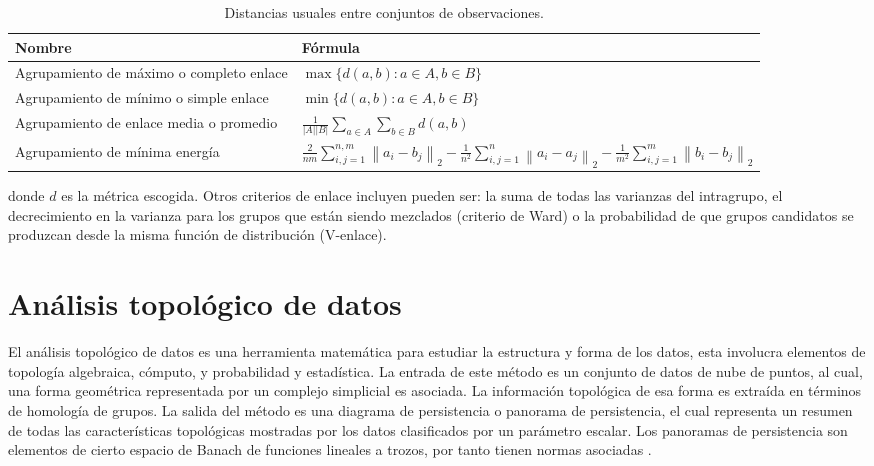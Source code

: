 \begin{table}[h]
	\centering
	\begin{tabular}{m{8cm} m{8cm}  }
		\toprule
		\textbf{Nombre} & \textbf{Fórmula}\\
		\midrule
		Agrupamiento de máximo o completo enlace & $\max \{d(a, b): a \in A, b \in B\}$ \\
		\hline
		Agrupamiento de mínimo o simple enlace & $\min \{d(a, b): a \in A, b \in B\}$ \\
		\hline
		Agrupamiento de enlace media o promedio & $\frac{1}{|A||B|} \sum_{a \in A} \sum_{b \in B} d(a, b)$ \\
		\hline
		Agrupamiento de mínima energía & \parbox[t]{8cm}{
			$\frac{2}{n m} \sum_{i,j=1}^{n,m}\left\|a_{i}-b_{j}\right\|_{2} -
			\frac{1}{n^{2}} \sum_{i,j=1}^{n}\left\|a_{i}-a_{j}\right\|_{2}-
			\frac{1}{m^{2}} \sum_{i, j=1}^{m}\left\|b_{i}-b_{j}\right\|_{2}$
		} \\
		\bottomrule
		\hline
	\end{tabular}
	\caption{Distancias usuales entre conjuntos de observaciones.}
	\label{tab:critEnlance}
\end{table}

donde $d$ es la métrica escogida. Otros criterios de enlace incluyen pueden ser: la suma de todas las varianzas del intragrupo, el decrecimiento en la varianza para los grupos que están siendo mezclados (criterio de Ward) o la probabilidad de que grupos candidatos se produzcan desde la misma función de distribución (V-enlace).

\section{Análisis topológico de datos}

El análisis topológico de datos es una herramienta matemática para estudiar la estructura y forma de los datos, esta involucra elementos de topología algebraica, cómputo, y probabilidad y estadística. 
La entrada de este método es un conjunto de datos de nube de puntos, al cual, una forma geométrica representada por un complejo simplicial es asociada. La información topológica de esa forma es extraída en términos de homología de grupos. La salida del método es una diagrama de persistencia o panorama de persistencia, el cual representa un resumen de todas las características topológicas mostradas por los datos clasificados por un parámetro escalar. Los panoramas de persistencia son elementos de cierto espacio de Banach de funciones lineales a trozos, por tanto tienen normas asociadas \cite{gideaTopologicalRecognitionCritical2020}.

